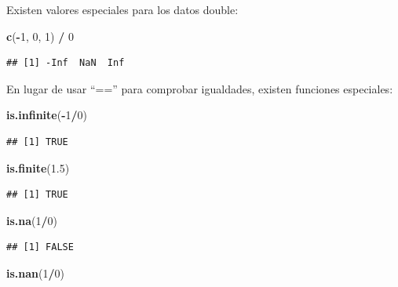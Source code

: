 \documentclass[]{book}
\newenvironment{Shaded}{\begin{snugshade}}{\end{snugshade}}
\newcommand{\KeywordTok}[1]{\textcolor[rgb]{0.13,0.29,0.53}{\textbf{#1}}}
\newcommand{\DecValTok}[1]{\textcolor[rgb]{0.00,0.00,0.81}{#1}}
\newcommand{\FloatTok}[1]{\textcolor[rgb]{0.00,0.00,0.81}{#1}}
\newcommand{\StringTok}[1]{\textcolor[rgb]{0.31,0.60,0.02}{#1}}
\newcommand{\OperatorTok}[1]{\textcolor[rgb]{0.81,0.36,0.00}{\textbf{#1}}}
\newcommand{\NormalTok}[1]{#1}
\theoremstyle{definition}
\theoremstyle{definition}
\theoremstyle{definition}
\theoremstyle{remark}
\begin{document}
Existen valores especiales para los datos double:

\begin{Shaded}
\begin{Highlighting}[]
\KeywordTok{c}\NormalTok{(}\OperatorTok{-}\DecValTok{1}\NormalTok{, }\DecValTok{0}\NormalTok{, }\DecValTok{1}\NormalTok{) }\OperatorTok{/}\StringTok{ }\DecValTok{0}
\end{Highlighting}
\end{Shaded}

\begin{verbatim}
## [1] -Inf  NaN  Inf
\end{verbatim}

En lugar de usar ``=='' para comprobar igualdades, existen funciones
especiales:

\begin{Shaded}
\begin{Highlighting}[]
\KeywordTok{is.infinite}\NormalTok{(}\OperatorTok{-}\DecValTok{1}\OperatorTok{/}\DecValTok{0}\NormalTok{)}
\end{Highlighting}
\end{Shaded}

\begin{verbatim}
## [1] TRUE
\end{verbatim}

\begin{Shaded}
\begin{Highlighting}[]
\KeywordTok{is.finite}\NormalTok{(}\FloatTok{1.5}\NormalTok{)}
\end{Highlighting}
\end{Shaded}

\begin{verbatim}
## [1] TRUE
\end{verbatim}

\begin{Shaded}
\begin{Highlighting}[]
\KeywordTok{is.na}\NormalTok{(}\DecValTok{1}\OperatorTok{/}\DecValTok{0}\NormalTok{)}
\end{Highlighting}
\end{Shaded}

\begin{verbatim}
## [1] FALSE
\end{verbatim}

\begin{Shaded}
\begin{Highlighting}[]
\KeywordTok{is.nan}\NormalTok{(}\DecValTok{1}\OperatorTok{/}\DecValTok{0}\NormalTok{)}
\end{Highlighting}
\end{Shaded}
\end{document}
